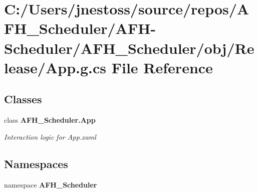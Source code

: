 \section{C\+:/\+Users/jnestoss/source/repos/\+A\+F\+H\+\_\+\+Scheduler/\+A\+F\+H-\/\+Scheduler/\+A\+F\+H\+\_\+\+Scheduler/obj/\+Release/\+App.g.\+cs File Reference}
\label{_release_2_app_8g_8cs}
\subsection*{Classes}
\begin{DoxyCompactItemize}
\item 
class \textbf{ A\+F\+H\+\_\+\+Scheduler.\+App}
\begin{DoxyCompactList}\small\item\em Interaction logic for App.\+xaml \end{DoxyCompactList}\end{DoxyCompactItemize}
\subsection*{Namespaces}
\begin{DoxyCompactItemize}
\item 
namespace \textbf{ A\+F\+H\+\_\+\+Scheduler}
\end{DoxyCompactItemize}

